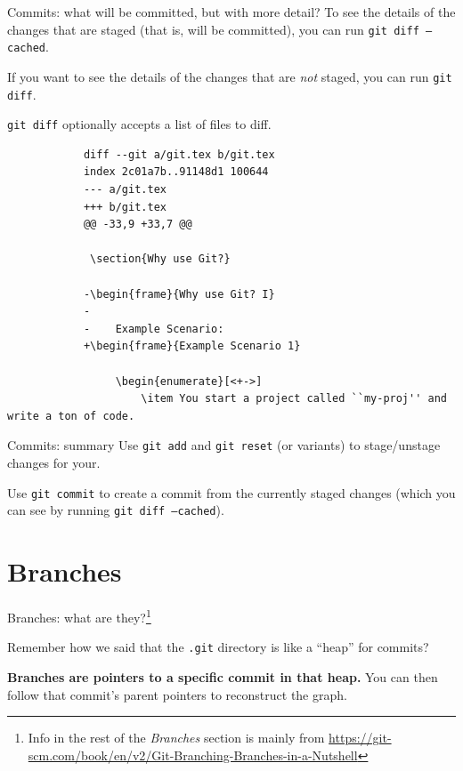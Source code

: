 \documentclass{beeper}
\begin{document}
\begin{frame}[fragile]{Commits: what will be committed, but with more detail?}
    To see the details of the changes that are staged (that is, will be
    committed), you can run \texttt{git diff --cached}.

    If you want to see the details of the changes that are \textit{not} staged,
    you can run \texttt{git diff}.

    \texttt{git diff} optionally accepts a list of files to diff.
    \pause

    {
        \tiny
        \begin{verbatim}
            diff --git a/git.tex b/git.tex
            index 2c01a7b..91148d1 100644
            --- a/git.tex
            +++ b/git.tex
            @@ -33,9 +33,7 @@

             \section{Why use Git?}

            -\begin{frame}{Why use Git? I}
            -
            -    Example Scenario:
            +\begin{frame}{Example Scenario 1}

                 \begin{enumerate}[<+->]
                     \item You start a project called ``my-proj'' and write a ton of code.
        \end{verbatim}
    }
\end{frame}

\begin{frame}{Commits: summary}
    Use \texttt{git add} and \texttt{git reset} (or variants) to stage/unstage
    changes for your.
    \pause

    Use \texttt{git commit} to create a commit from the currently staged changes
    (which you can see by running \texttt{git diff --cached}).
\end{frame}

\section{Branches}

\begin{frame}{Branches: what are they?\footnote[frame]{Info in the rest of the
    \textit{Branches} section is mainly from
    \url{https://git-scm.com/book/en/v2/Git-Branching-Branches-in-a-Nutshell}}}

    Remember how we said that the \texttt{.git} directory is like a ``heap'' for
    commits?

    \textbf{Branches are pointers to a specific commit in that heap.} You can
    then follow that commit's parent pointers to reconstruct the graph.
\end{frame}
\end{document}
